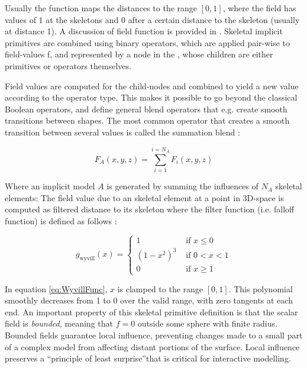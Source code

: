 Usually the function maps the distances to the range $[0, 1]$, where the field has values of 1 at the 
skeletons and 0 after a certain distance to the skeleton (usually at distance 1). A discussion of field 
function is provided in \cite{shirley2009graphics}. Skeletal implicit primitives are combined 
using binary operators, which are applied pair-wise to field-values f, and represented by a 
node in the \blob, whose children are either primitives or operators themselves.

Field values are computed for the child-nodes and combined to yield a new value according 
to the operator type. This makes it possible to go beyond the classical Boolean operators, 
and define general blend operators that e.g. create smooth transitions between shapes. The 
most common operator that creates a smooth transition between several values is called the 
summation blend \cite{Bloomenthal1997}:

\begin{equation}
F_A(x, y, z)=\sum_{i=1}^{i=N_A}F_i(x, y, z)
\end{equation}

Where an implicit model $A$ is generated by summing the influences of $N_A$ skeletal elements: 
The field value due to an skeletal element at a point in 3D-space is computed as filtered distance to its skeleton 
where the filter function (i.e. falloff function) is defined as follows \cite{Wyvill1999}: 

\begin{equation}
g_\mathrm{wyvill}(x)= \left\{ \begin{array}{rl}
 1 &\mbox{ if $x\leq0$} \\
 (1-x^2)^3 &\mbox{ if $0<x<1$}\\
  0 &\mbox{ if $x\geq1$}  
  \end{array} \right.
\label{eq:WyvillFunc}
\end{equation}

In equation \ref{eq:WyvillFunc}, $x$ is clamped to the range $[0,1]$. This polynomial smoothly decreases from 1 to 0 over the valid range, with zero
tangents at each end. An important property of this skeletal primitive definition is that the scalar field is \textit{bounded}, meaning that $f=0$
outside some sphere with finite radius. Bounded fields guarantee local influence, preventing changes made to a small part of a complex model from
affecting distant portions of the surface. Local influence preserves a \textquotedblleft principle of least surprise\textquotedblright that is critical 
for interactive modelling.  

